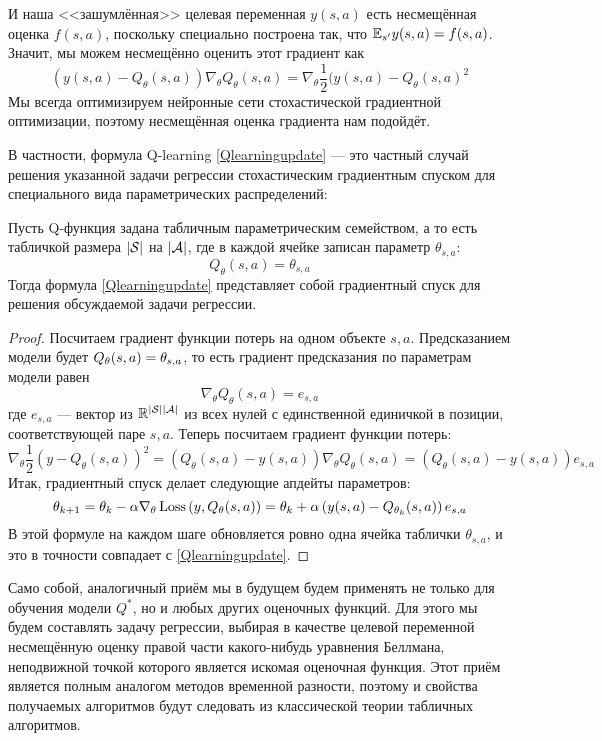 И наша <<зашумлённая>> целевая переменная $y(s, a)$ есть несмещённая оценка $f(s, a)$, поскольку специально построена так, что $\mathbb{E}_{s'} y(s, a) = f(s, a)$. Значит, мы можем несмещённо оценить этот градиент как 
\begin{equation}\label{DQNgradient}
(y(s, a) - Q_{\theta}(s, a))\nabla_\theta Q_{\theta}(s, a) = \nabla_\theta \frac{1}{2}(y(s, a) - Q_{\theta}(s, a)^2
\end{equation}
Мы всегда оптимизируем нейронные сети стохастической градиентной оптимизации, поэтому несмещённая оценка градиента нам подойдёт.

В частности, формула Q-learning \eqref{Qlearningupdate} --- это частный случай решения указанной задачи регрессии стохастическим градиентным спуском для специального вида параметрических распределений:

\begin{theorem}
Пусть Q-функция задана табличным параметрическим семейством, а то есть табличкой размера $|\mathcal{S}|$ на $|\mathcal{A}|$, где в каждой ячейке записан параметр $\theta_{s, a}$:
$$Q_{\theta}(s, a) = \theta_{s, a}$$
Тогда формула \eqref{Qlearningupdate} представляет собой градиентный спуск для решения обсуждаемой задачи регрессии.

\begin{proof}
Посчитаем градиент функции потерь на одном объекте $s, a$. Предсказанием модели будет $Q_{\theta}(s, a) \HM= \theta_{s, a}$, то есть градиент предсказания по параметрам модели равен
$$\nabla_\theta Q_{\theta}(s, a) = e_{s, a}$$
где $e_{s, a}$ --- вектор из $\mathbb{R}^{|\mathcal{S}| |\mathcal{A}|}$ из всех нулей с единственной единичкой в позиции, соответствующей паре $s, a$. Теперь посчитаем градиент функции потерь:
$$\nabla_\theta \frac{1}{2} \left( y - Q_{\theta}(s, a) \right)^2 = \left( Q_{\theta}(s, a) - y(s, a) \right) \nabla_\theta Q_{\theta}(s, a) = \left( Q_{\theta}(s, a) - y(s, a) \right) e_{s, a}$$
Итак, градиентный спуск делает следующие апдейты параметров:
$$\theta_{k+1} = \theta_k - \alpha \nabla_\theta \operatorname{Loss} \left( y, Q_{\theta}(s, a) \right) = \theta_k + \alpha \left( y(s, a) - Q_{\theta_k}(s, a) \right) e_{s, a}$$
В этой формуле на каждом шаге обновляется ровно одна ячейка таблички $\theta_{s, a}$, и это в точности совпадает с \eqref{Qlearningupdate}.
\end{proof}
\end{theorem}

Само собой, аналогичный приём мы в будущем будем применять не только для обучения модели $Q^*$, но и любых других оценочных функций. Для этого мы будем составлять задачу регрессии, выбирая в качестве целевой переменной несмещённую оценку правой части какого-нибудь уравнения Беллмана, неподвижной точкой которого является искомая оценочная функция. Этот приём является полным аналогом методов временной разности, поэтому и свойства получаемых алгоритмов будут следовать из классической теории табличных алгоритмов. 


